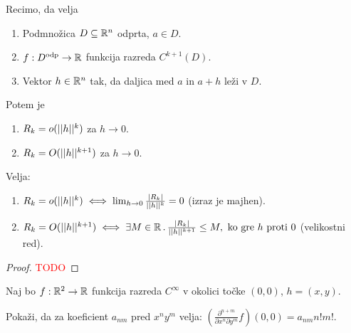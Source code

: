 \begin{posledica}
    Recimo, da velja
    \begin{enumerate}
        \item Podmnožica $D \subseteq \mathbb{R}^n$ odprta, $a \in D$.
        \item $f: D^{\text{odp}} \to \mathbb{R}$ funkcija razreda $C^{k+1}(D)$.
        \item Vektor $h \in \mathbb{R}^n$ tak, da daljica med $a$ in $a+h$ leži v $D$.
    \end{enumerate}
    Potem je 
    \begin{enumerate}
        \item $R_k = o(||h||^k)$ za $h \to 0$.
        \item $R_k = O(||h||^{k+1})$ za $h \to 0$.
    \end{enumerate}
\end{posledica}

\begin{opomba}
    Velja:
    \begin{enumerate}
        \item $R_k = o(||h||^k) \iff \lim_{h \to 0} \frac{|R_k|}{||h||^k} = 0$ (izraz je majhen).
        \item $R_k = O(||h||^{k+1}) \iff \exists M \in \mathbb{R} \,.\, \frac{|R_k|}{||h||^{k+1}} \leq M, \text{ ko gre } h \text{ proti } 0$ (velikostni red).
    \end{enumerate}
\end{opomba}

\begin{proof}
    \textcolor{red}{TODO}
\end{proof}

\begin{opomba}
    Naj bo $f: \mathbb{R}^2 \to \mathbb{R}$ funkcija razreda $C^\infty$ v okolici točke $(0,0)$, $h = (x, y)$. 
    
    Pokaži, da za koeficient $a_{nm}$ pred $x^ny^m$ velja: $(\frac{\partial^{n+m}}{\partial x^n \partial y^m} f)(0,0) = a_{nm} n!m!$. 
\end{opomba}

\newpage
